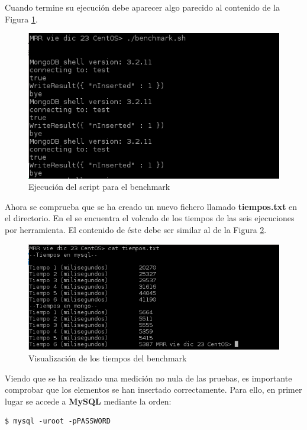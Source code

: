 Cuando termine su ejecución debe aparecer algo parecido al contenido de la Figura \ref{fig:figura5-1}. 
\begin{figure}[H] %
	\centering
	\includegraphics[scale=0.7]{figuras/ejercicio5/figura5-1.png} 
	\caption{Ejecución del script para el benchmark} 
	\label{fig:figura5-1}
\end{figure}

Ahora se comprueba que se ha creado un nuevo fichero llamado \textbf{tiempos.txt} en el directorio. En el se encuentra el volcado de los tiempos de las seis ejecuciones por herramienta. El contenido de éste debe ser similar al de la Figura \ref{fig:figura5-7}.

\begin{figure}[H] %
	\centering
	\includegraphics[scale=0.7]{figuras/ejercicio5/figura5-7.png} 
	\caption{Visualización de los tiempos del benchmark} 
	\label{fig:figura5-7}
\end{figure}

Viendo que se ha realizado una medición no nula de las pruebas, es importante comprobar que los elementos se han insertado correctamente. Para ello, en primer lugar se accede a \textbf{MySQL} mediante la orden:
\begin{lstlisting}[style=fich]
$ mysql -uroot -pPASSWORD
\end{lstlisting}
\vspace{-22pt}

